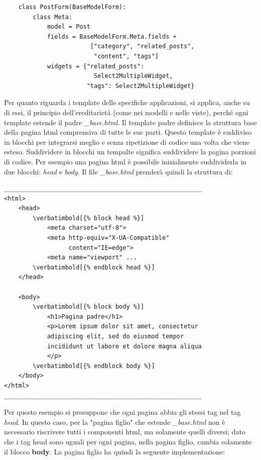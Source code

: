 \documentclass[12pt,a4paper]{article}
\newcommand\verbatimbold[1]{\textbf{#1}}
\begin{document}
\begin{verbatim}
    class PostForm(BaseModelForm):
        class Meta:
            model = Post
            fields = BaseModelForm.Meta.fields +
                        ["category", "related_posts",
                         "content", "tags"]
            widgets = {"related_posts":
                         Select2MultipleWidget,
                       "tags": Select2MultipleWidget}
\end{verbatim}

Per quanto riguarda i template delle specifiche applicazioni, si applica, anche su di essi, il principio dell'ereditarietà (come nei modelli e nelle viste), perché ogni template estende il padre \textit{\_base.html}. Il template padre definisce la struttura base della pagina html comprensiva di tutte le sue parti. Questo template è suddiviso in blocchi per integrarsi meglio e senza ripetizione di codice una volta che viene esteso. Suddividere in blocchi un tempalte significa suddividere la pagina porzioni di codice. Per esempio una pagina html è possibile inizialmente suddividerla in due blocchi: \textit{head} e \textit{body}. Il file \textit{\_base.html} prenderà quindi la struttura di:

\begin{Verbatim}[commandchars=\\\[\]]
_______________________________________________________
<html>
    <head>
        \verbatimbold[{% block head %}]
            <meta charset="utf-8">
            <meta http-equiv="X-UA-Compatible"
                  content="IE=edge">
            <meta name="viewport" ...
        \verbatimbold[{% endblock head %}]
    </head>

    <body>
        \verbatimbold[{% block body %}]
            <h1>Pagina padre</h1>
            <p>Lorem ipsum dolor sit amet, consectetur
            adipiscing elit, sed do eiusmod tempor
            incididunt ut labore et dolore magna aliqua
            </p>
        \verbatimbold[{% endblock body %}]
    </body>
</html>
_______________________________________________________
\end{Verbatim}
Per questo esempio si presuppone che ogni pagina abbia gli stessi tag nel tag \textit{head}.
In questo caso, per la "pagina figlio" che estende \textit{\_base.html} non è necessario riscrivere tutti i componenti html, ma solamente quelli diversi; dato che i tag head sono uguali per ogni pagina, nella pagina figlio, cambia solamente il blocco \textbf{body}. La pagina figlio ha quindi la seguente implementazione:
\end{document}
